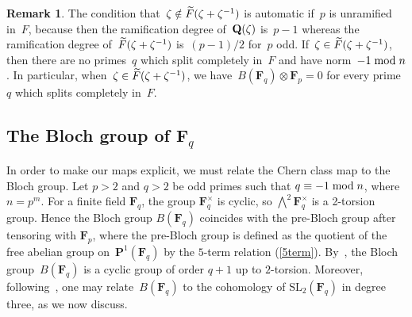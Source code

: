 \documentclass[12pt,reqno]{amsart}
\theoremstyle{definition}
\newtheorem{remark}[theorem]{Remark}
\newcommand{\changed}[1]{{#1}}
\def\mod{\;\text{\rm mod}\;}
\def\Q{\mathbf Q}   %
\def\F{\mathbf F}   %
\def\wF{\widetilde{F}}
\def\SL{\mathrm{SL}}
\def\nn{n}
\def\ll{m}
\def\wF{\widetilde{F}}
\def\SL{\mathrm{SL}}
\begin{document}
\begin{remark} 
The condition that~$\z \notin \wF(\z + \z^{-1})$ is automatic if~$p$ 
is unramified in~$F$, because then the ramification degree of~$\Q(\z)$ 
is~$p-1$ whereas the ramification degree of~$\wF(\z + \z^{-1})$ 
is~$(p-1)/2$ for~$p$ odd. If~$\z \in \wF(\z + \z^{-1})$, then 
there are no primes~$q$ which split completely in~$F$ and have 
norm~$-1 \mod \nn$.  In particular, when~$\z \in \wF(\z + \z^{-1})$, 
we have~$B(\F_q)\otimes\F_p=0$ for every prime~$q$ which splits completely 
in~$F$.
\end{remark}
 
\subsection{The Bloch group of \texorpdfstring{$\F_q$}{Fq}}
\label{section:hh}

In order to make our maps explicit, we must relate the Chern class map to
the Bloch group. Let  $p > 2$ and $q > 2$ be odd primes such that 
$q \equiv -1 \mod \nn$, where $\nn=p^\ll$. For a finite field $\F_q$, the 
group $\F^{\times}_q$ is cyclic, so $\bigwedge^2 \F^{\times}_q$ is a 
2-torsion group. 
Hence the Bloch group $B(\F_q)$ coincides with the pre-Bloch group after 
tensoring 
with $\F_p$, where the pre-Bloch group is defined as the quotient of the 
free abelian 
group \changed{on~$\mathbf{P}^1(\F_q)$} by the $5$-term relation \changed{(\ref{5term})}.
By~\cite{Hutch}, the Bloch group~$B(\F_q)$ is a cyclic group of order 
$q+1$ up to $2$-torsion. Moreover, following~\cite{Hutch}, one may 
relate~$B(\F_q)$ to the cohomology of $\SL_2(\F_q)$ in degree three, 
as we now discuss.
\end{document}
